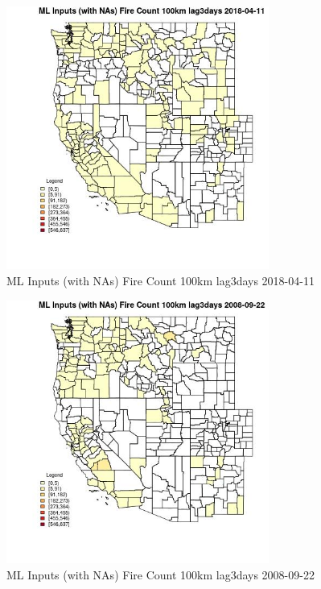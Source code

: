 \begin{figure} 
\centering  
\includegraphics[width=0.77\textwidth]{Code_Outputs/Report_ML_input_PM25_Step4_part_e_de_duplicated_aves_compiled_2019-05-18wNAs_CountyFire_Count_100km_lag3daysMean2018-04-11.jpg} 
\caption{\label{fig:Report_ML_input_PM25_Step4_part_e_de_duplicated_aves_compiled_2019-05-18wNAsCountyFire_Count_100km_lag3daysMean2018-04-11}ML Inputs (with NAs) Fire Count 100km lag3days 2018-04-11} 
\end{figure} 
 

\begin{figure} 
\centering  
\includegraphics[width=0.77\textwidth]{Code_Outputs/Report_ML_input_PM25_Step4_part_e_de_duplicated_aves_compiled_2019-05-18wNAs_CountyFire_Count_100km_lag3daysMean2008-09-22.jpg} 
\caption{\label{fig:Report_ML_input_PM25_Step4_part_e_de_duplicated_aves_compiled_2019-05-18wNAsCountyFire_Count_100km_lag3daysMean2008-09-22}ML Inputs (with NAs) Fire Count 100km lag3days 2008-09-22} 
\end{figure} 
 

